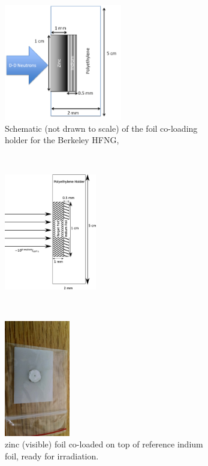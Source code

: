 \documentclass[5p]{elsarticle}
\begin{document}
\begin{figure}
    \centering
    \begin{subfigure}[t]{0.3\textwidth}
        \centering
        \includegraphics[height=2in]{./figures/foils.png}
        \caption{Schematic (not drawn to scale) of the foil co-loading holder for the Berkeley HFNG,}
        \label{fig:holder_a}
    \end{subfigure}%
    ~ 
    \begin{subfigure}[t]{0.3\textwidth}
        \centering
        \includegraphics[height=2in]{./figures/holder.pdf}
        \caption{}
                \label{fig:holder_b}
    \end{subfigure}
     ~ 
    \begin{subfigure}[t]{0.3\textwidth}
        \centering
        \includegraphics[height=2in]{./figures/IMG_20151103_113432563.jpg}
        \caption{ zinc (visible) foil co-loaded on top of reference indium foil, ready for irradiation.}
                \label{fig:holder_c}
    \end{subfigure}
    \caption{}
     \label{fig:main_holders}
\end{figure}
\end{document}
